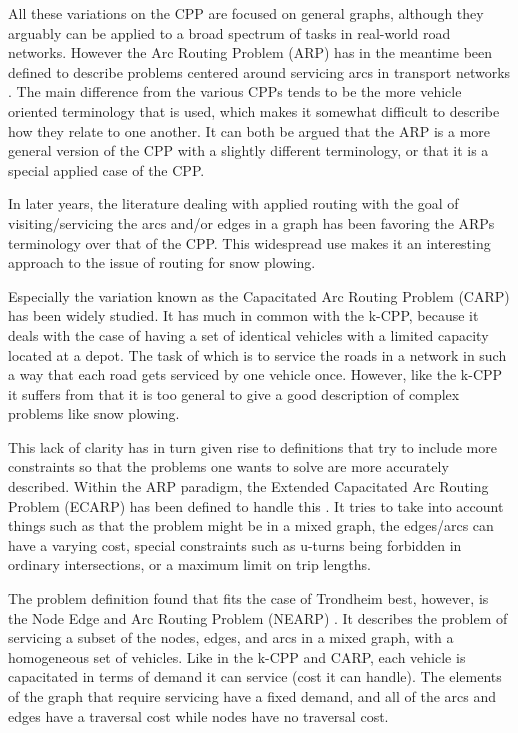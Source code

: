 All these variations on the CPP are focused on general graphs, although they arguably can be applied to a broad spectrum of tasks in real-world road networks. However the Arc Routing Problem (ARP) has in the meantime been defined to describe problems centered around servicing arcs in transport networks \citep{eiselt1995ARP}. The main difference from the various CPPs tends to be the more vehicle oriented terminology that is used, which makes it somewhat difficult to describe how they relate to one another. It can both be argued that the ARP is a more general version of the CPP with a slightly different terminology, or that it is a special applied case of the CPP.

In later years, the literature dealing with applied routing with the goal of visiting/servicing the arcs and/or edges in a graph has been favoring the ARPs terminology over that of the CPP. This widespread use makes it an interesting approach to the issue of routing for snow plowing.

Especially the variation known as the Capacitated Arc Routing Problem (CARP) \citep{ulusoy1985CARP} has been widely studied. It has much in common with the k-CPP, because it deals with the case of having a set of identical vehicles with a limited capacity located at a depot. The task of which is to service the roads in a network in such a way that each road gets serviced by one vehicle once. However, like the k-CPP it suffers from that it is too general to give a good description of complex problems like snow plowing.

This lack of clarity has in turn given rise to definitions that try to include more constraints so that the problems one wants to solve are more accurately described. Within the ARP paradigm, the Extended Capacitated Arc Routing Problem (ECARP) has been defined to handle this \citep{lacomme2004competitiveMA}. It tries to take into account things such as that the problem might be in a mixed graph, the edges/arcs can have a varying cost, special constraints such as u-turns being forbidden in ordinary intersections, or a maximum limit on trip lengths.

The problem definition found that fits the case of Trondheim best, however, is the Node Edge and Arc Routing Problem (NEARP) \citep{prins2005memeticNEARP}. It describes the problem of servicing a subset of the nodes, edges, and arcs in a mixed graph, with a homogeneous set of vehicles. Like in the k-CPP and CARP, each vehicle is capacitated in terms of demand it can service (cost it can handle). The elements of the graph that require servicing have a fixed demand, and all of the arcs and edges have a traversal cost while nodes have no traversal cost.

